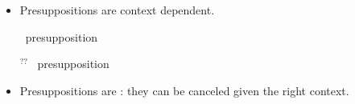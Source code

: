 \documentclass[a4paper,landscape,headrule,footrule,xetex]{foils}
\begin{document}
\begin{itemize}
\item  Presuppositions are context dependent. 
\begin{exe}
    \ex \begin{xlist}
      \ex {}
      \ex   \hfill presupposition
    \end{xlist}
 \ex \begin{xlist}
   \ex $^{??}$
   \ex   \hfill presupposition
 \end{xlist}
\end{exe}
\item Presuppositions are : they can be canceled
  given the right context.

\end{itemize}




\end{document}

